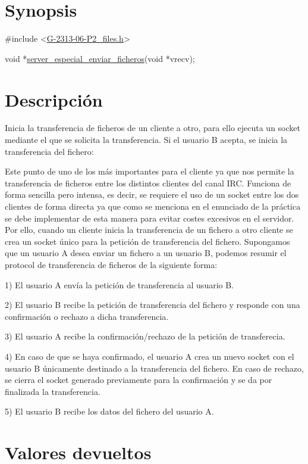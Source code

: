 \hypertarget{server_especial_enviar_ficheros_synopsis_file}{}\section{Synopsis}\label{server_especial_enviar_ficheros_synopsis_file}

\begin{DoxyCode}
\textcolor{preprocessor}{#include <\hyperlink{G-2313-06-P2__files_8h}{G-2313-06-P2\_files.h}>}

\textcolor{keywordtype}{void} *\hyperlink{G-2313-06-P2__files_8h_ad00af19306b45db3947f1b89ae4b5def}{server\_especial\_enviar\_ficheros}(\textcolor{keywordtype}{void} *vrecv);
\end{DoxyCode}
 \hypertarget{server_especial_enviar_ficheros_descripcion_file}{}\section{Descripción}\label{server_especial_enviar_ficheros_descripcion_file}
Inicia la transferencia de ficheros de un cliente a otro, para ello ejecuta un socket mediante el que se solicita la transferencia. Si el usuario B acepta, se inicia la transferencia del fichero\+:

Este punto de uno de los más importantes para el cliente ya que nos permite la transferencia de ficheros entre los distintos clientes del canal I\+RC. Funciona de forma sencilla pero intensa, es decir, se requiere el uso de un socket entre los dos clientes de forma directa ya que como se menciona en el enunciado de la práctica se debe implementar de esta manera para evitar costes excesivos en el servidor. Por ello, cuando un cliente inicia la transferencia de un fichero a otro cliente se crea un socket único para la petición de transferencia del fichero. Supongamos que un usuario A desea enviar un fichero a un usuario B, podemos resumir el protocol de transferencia de ficheros de la siguiente forma\+: 
\begin{DoxyItemize}
\item 1) El usuario A envía la petición de transferencia al usuario B. 
\item 2) El usuario B recibe la petición de transferencia del fichero y responde con una confirmación o rechazo a dicha transferencia. 
\item 3) El usuario A recibe la confirmación/rechazo de la petición de transferecia. 
\item 4) En caso de que se haya confirmado, el usuario A crea un nuevo socket con el usuario B únicamente destinado a la transferencia del fichero. En caso de rechazo, se cierra el socket generado previamente para la confirmación y se da por finalizada la transferencia. 
\item 5) El usuario B recibe los datos del fichero del usuario A. 
\end{DoxyItemize}\hypertarget{server_especial_recibir_ficheros_return_2}{}\section{Valores devueltos}\label{server_especial_recibir_ficheros_return_2}


